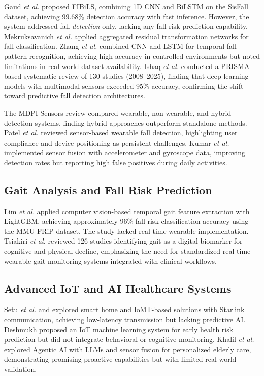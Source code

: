 \documentclass[conference]{IEEEtran}
\begin{document}
Gaud \textit{et al.} \cite{gaud2025} proposed FIBiLS, combining 1D CNN and BiLSTM on the SisFall dataset, achieving 99.68\% detection accuracy with fast inference. However, the system addressed fall \textit{detection} only, lacking any fall risk prediction capability. Mekruksavanich \textit{et al.} \cite{mekruksavanich2022} applied aggregated residual transformation networks for fall classification. Zhang \textit{et al.} \cite{zhang2025} combined CNN and LSTM for temporal fall pattern recognition, achieving high accuracy in controlled environments but noted limitations in real-world dataset availability. Ishaq \textit{et al.} \cite{ishaq2026} conducted a PRISMA-based systematic review of 130 studies (2008--2025), finding that deep learning models with multimodal sensors exceeded 95\% accuracy, confirming the shift toward predictive fall detection architectures.

The MDPI Sensors review \cite{mdpi2025review} compared wearable, non-wearable, and hybrid detection systems, finding hybrid approaches outperform standalone methods. Patel \textit{et al.} \cite{patel2023} reviewed sensor-based wearable fall detection, highlighting user compliance and device positioning as persistent challenges. Kumar \textit{et al.} \cite{kumar2024} implemented sensor fusion with accelerometer and gyroscope data, improving detection rates but reporting high false positives during daily activities.

\subsection{Gait Analysis and Fall Risk Prediction}

Lim \textit{et al.} \cite{lim2024} applied computer vision-based temporal gait feature extraction with LightGBM, achieving approximately 96\% fall risk classification accuracy using the MMU-FRiP dataset. The study lacked real-time wearable implementation. Tsiakiri \textit{et al.} \cite{tsiakiri2025} reviewed 126 studies identifying gait as a digital biomarker for cognitive and physical decline, emphasizing the need for standardized real-time wearable gait monitoring systems integrated with clinical workflows.

\subsection{Advanced IoT and AI Healthcare Systems}

Setu \textit{et al.} \cite{setu2024smart} and \cite{setu2025} explored smart home and IoMT-based solutions with Starlink communication, achieving low-latency transmission but lacking predictive AI. Deshmukh \cite{deshmukh2026} proposed an IoT machine learning system for early health risk prediction but did not integrate behavioral or cognitive monitoring. Khalil \textit{et al.} \cite{khalil2026} explored Agentic AI with LLMs and sensor fusion for personalized elderly care, demonstrating promising proactive capabilities but with limited real-world validation.
\end{document}
